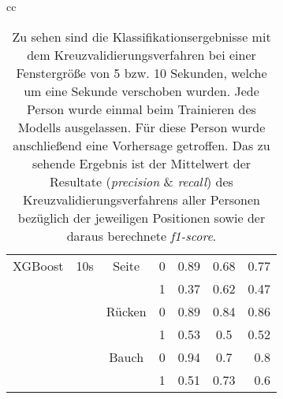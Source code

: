 \begin{table}
\begin{tabular}{cc}
\begin{minipage}{1\linewidth}
\begin{center}
\begin{tabular}{ | l | c | c | c | c | c | r | }
            \hline
            XGBoost & 10s & Seite & 0 & 0.89 & 0.68 & 0.77 \\
                    &     &       & 1 & 0.37 & 0.62 & 0.47 \\ \hline
                    &     & Rücken& 0 & 0.89 & 0.84 & 0.86 \\
                    &     &       & 1 & 0.53 & 0.5  & 0.52 \\ \hline
                    &     & Bauch & 0 & 0.94 & 0.7  & 0.8  \\
                    &     &       & 1 & 0.51 & 0.73 & 0.6  \\ \hline
          \end{tabular}
          \smallskip
      \end{center}
  \end{minipage} 
    
  \end{tabular}
  \caption{Zu sehen sind die Klassifikationsergebnisse mit dem Kreuzvalidierungsverfahren bei einer Fenstergröße von 5 bzw. 10 Sekunden, welche um eine Sekunde verschoben wurden. Jede Person wurde einmal beim Trainieren des Modells ausgelassen. Für diese Person wurde anschließend eine Vorhersage getroffen. Das zu sehende Ergebnis ist der Mittelwert der Resultate (\textit{precision} \& \textit{recall}) des Kreuzvalidierungsverfahrens aller Personen bezüglich der jeweiligen Positionen sowie der daraus berechnete \textit{f1-score}.}
  \label{evaluation:loso_classification_results}  
\end{table}